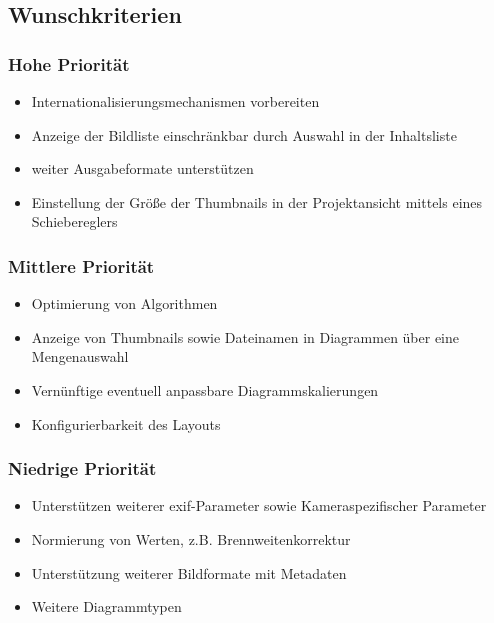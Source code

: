 \subsection{Wunschkriterien} 

\subsubsection{Hohe Priorität}

	\begin{itemize}
		\item Internationalisierungsmechanismen vorbereiten
		\item Anzeige der Bildliste einschränkbar durch Auswahl in der Inhaltsliste
		\item weiter Ausgabeformate unterstützen 
		\item Einstellung der Größe der Thumbnails in der Projektansicht mittels eines Schiebereglers
	\end{itemize}

\subsubsection{Mittlere Priorität}

	\begin{itemize}
		\item Optimierung von Algorithmen
		\item Anzeige von Thumbnails sowie Dateinamen in Diagrammen über eine Mengenauswahl
		\item Vernünftige eventuell anpassbare Diagrammskalierungen
		\item Konfigurierbarkeit des Layouts	
	\end{itemize}

\subsubsection{Niedrige Priorität}

	\begin{itemize}
		\item Unterstützen weiterer \gls{exif}-Parameter sowie Kameraspezifischer Parameter
		\item Normierung von Werten, z.B. Brennweitenkorrektur
		\item Unterstützung weiterer Bildformate mit Metadaten 	
		\item Weitere Diagrammtypen
	\end{itemize}

